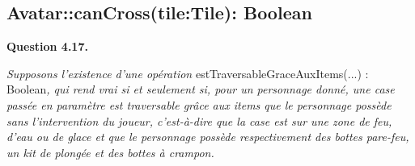 \documentclass[oneside,a4paper]{book}
\begin{document}
\subsection{Avatar::canCross(tile:Tile): Boolean}

\textbf{Question 4.17.}\label{Question 4.17.}\newline

\nopagebreak 

\textit{Supposons l'existence d'une opération} estTraversableGraceAuxItems(...) : Boolean\textit{, qui rend vrai si et seulement si, pour un personnage donné, une case passée en paramètre est traversable grâce aux items que le personnage possède sans l'intervention du joueur, c'est-à-dire que la case est sur une zone de feu, d'eau ou de glace et que le personnage possède respectivement des bottes pare-feu, un kit de plongée et des bottes à crampon.}
\end{document}
